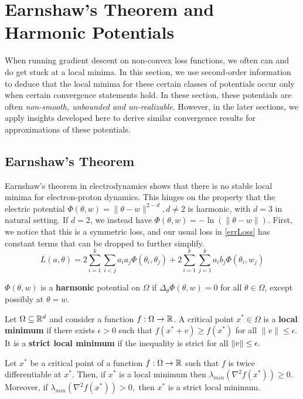 \section{Earnshaw's Theorem and Harmonic Potentials} 
\label{sec:earnshaw}
%
When running gradient descent on non-convex loss functions, we often
can and do get stuck at a local minima. In this section, we use
second-order information to deduce that the local
minima for these certain classes of potentials occur only when certain convergence statements hold. In these section, these potentials are often {\it non-smooth, unbounded and un-realizable}. However, in the later sections, we apply insights developed here to derive similar convergence results for approximations of these potentials.
%
\subsection{Earnshaw's Theorem}
%
Earnshaw's theorem in electrodynamics shows that there is no stable
local minima for electron-proton dynamics. This hinges on the property
that the electric potential
$\Phi(\theta,w) = \|\theta-w\|^{2-d}, d \neq 2$ is harmonic, with
$d = 3$ in natural setting. If $d = 2$, we instead have
$\Phi(\theta, w) = - \ln(\|\theta - w\|)$. First, we notice that this
is a symmetric loss, and our usual loss in \eqref{errLoss} has
constant terms that can be dropped to further simplify.
%
\begin{equation}\label{errSimp}
\overline{L}(a,\theta) =  2\sum_{i=1}^k\sum_{i < j} a_ia_j\Phi(\theta_i,\theta_j) + 2\sum_{i=1}^k\sum_{j=1}^ka_ib_j \Phi(\theta_i,w_j)
\end{equation} 
%
\begin{definition}
$\Phi(\theta,w)$ is a {\bf harmonic} potential on $\Omega$ if $\Delta_\theta \Phi(\theta,w) = 0$ for all $\theta \in \Omega$, except possibly at $\theta = w$.
\end{definition}

\begin{definition}
  Let $\Omega \subseteq {\mathbb{R}}^d$ and consider a function
  $f:\Omega \to {\mathbb{R}}$. A critical point $x^* \in \Omega$ is a {\bf local
    minimum} if there exists $\epsilon > 0$ such that
  $f(x^*+v) \geq f(x^*)$ for all $\|v\|\leq \epsilon$. It is a {\bf
    strict local minimum} if the inequality is strict for all
  $\left\lVert v \right\rVert \le \epsilon.$
\end{definition} 
%
\begin{fact}
  Let $x^*$ be a critical point of a function $f : \Omega \to {\mathbb{R}}$ such
  that $f$ is twice differentiable at $x^*.$ Then, if $x^*$ is a local
  minimum then $\lambda_{min}(\nabla^2 f(x^*)) \geq 0.$ Moreover, if
  $\lambda_{min}(\nabla^2 f(x^*)) > 0,$ then $x^*$ is a strict local minimum.
\end{fact}
%

